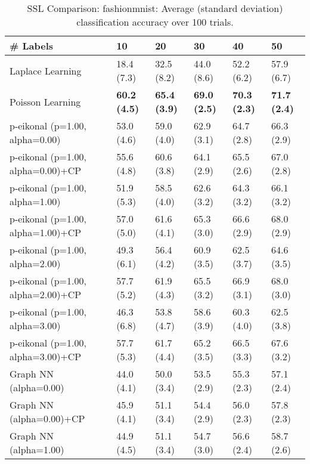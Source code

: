 \documentclass{article}
\begin{document}
\begin{table*}[t!]
\vspace{-3mm}
\caption{SSL Comparison: fashionmnist: Average (standard deviation) classification accuracy over 100 trials.}
\vspace{-3mm}
\label{tab:SSL Comparison: fashionmnist}
\vskip 0.15in
\begin{center}
\begin{small}
\begin{sc}
\begin{tabular}{llllll}
\toprule
\# Labels&\textbf{10}&\textbf{20}&\textbf{30}&\textbf{40}&\textbf{50}\\
\midrule
Laplace Learning&18.4 (7.3)      &32.5 (8.2)      &44.0 (8.6)      &52.2 (6.2)      &57.9 (6.7)      \\
Poisson Learning&{\bf 60.2 (4.5)}&{\bf 65.4 (3.9)}&{\bf 69.0 (2.5)}&{\bf 70.3 (2.3)}&{\bf 71.7 (2.4)}\\
p-eikonal (p=1.00, alpha=0.00)&53.0 (4.6)      &59.0 (4.0)      &62.9 (3.1)      &64.7 (2.8)      &66.3 (2.9)      \\
p-eikonal (p=1.00, alpha=0.00)+CP&55.6 (4.8)      &60.6 (3.8)      &64.1 (2.9)      &65.5 (2.6)      &67.0 (2.8)      \\
p-eikonal (p=1.00, alpha=1.00)&51.9 (5.3)      &58.5 (4.0)      &62.6 (3.2)      &64.3 (3.2)      &66.1 (3.2)      \\
p-eikonal (p=1.00, alpha=1.00)+CP&57.0 (5.0)      &61.6 (4.1)      &65.3 (3.0)      &66.6 (2.9)      &68.0 (2.9)      \\
p-eikonal (p=1.00, alpha=2.00)&49.3 (6.1)      &56.4 (4.2)      &60.9 (3.5)      &62.5 (3.7)      &64.6 (3.5)      \\
p-eikonal (p=1.00, alpha=2.00)+CP&57.7 (5.2)      &61.9 (4.3)      &65.5 (3.2)      &66.9 (3.1)      &68.0 (3.0)      \\
p-eikonal (p=1.00, alpha=3.00)&46.3 (6.8)      &53.8 (4.7)      &58.6 (3.9)      &60.3 (4.0)      &62.5 (3.8)      \\
p-eikonal (p=1.00, alpha=3.00)+CP&57.7 (5.3)      &61.7 (4.4)      &65.2 (3.5)      &66.5 (3.3)      &67.6 (3.2)      \\
Graph NN (alpha=0.00)&44.0 (4.1)      &50.0 (3.4)      &53.5 (2.9)      &55.3 (2.3)      &57.1 (2.4)      \\
Graph NN (alpha=0.00)+CP&45.9 (4.1)      &51.1 (3.4)      &54.4 (2.9)      &56.0 (2.3)      &57.8 (2.3)      \\
Graph NN (alpha=1.00)&44.9 (4.5)      &51.1 (3.4)      &54.7 (3.0)      &56.6 (2.4)      &58.7 (2.6)      \\

\end{tabular}
\end{sc}
\end{small}
\end{center}
\end{table*}
\end{document}
